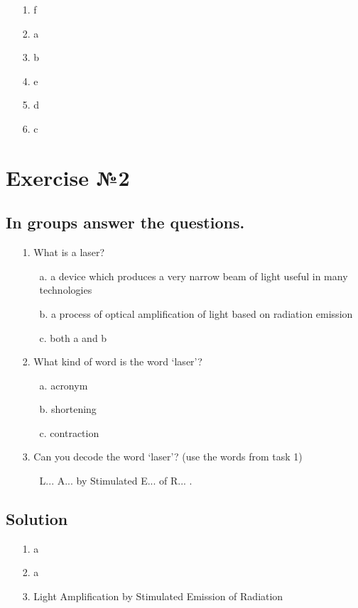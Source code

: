 \documentclass[12pt, a4paper]{report}
\begin{document}
\begin{enumerate}
    \item[1.] f
    \item[2.] a
    \item[3.] b
    \item[4.] e
    \item[5.] d
    \item[6.] c
\end{enumerate}

\section{Exercise №2}

\subsection{In groups answer the questions.}
\begin{enumerate}
    \item[1.] What is a laser?
        \begin{enumerate}
            \item[a.] a device which produces a very narrow beam of light useful in many technologies
            \item[b.] a process of optical amplification of light based on radiation emission
            \item[c.] both a and b
        \end{enumerate}
    \item[2.] What kind of word is the word ‘laser’?
        \begin{enumerate}
            \item[a.] acronym
            \item[b.] shortening
            \item[c.] contraction
        \end{enumerate}
    \item[3.] Can you decode the word ‘laser’? (use the words from task 1)
        \begin{enumerate}
            \item[] L... A... by Stimulated E... of R... .
        \end{enumerate}
\end{enumerate}

\subsection{Solution}
\begin{enumerate}
    \item[1.] a
    \item[2.] a
    \item[3.] Light Amplification by Stimulated Emission of Radiation
\end{enumerate}
\end{document}
